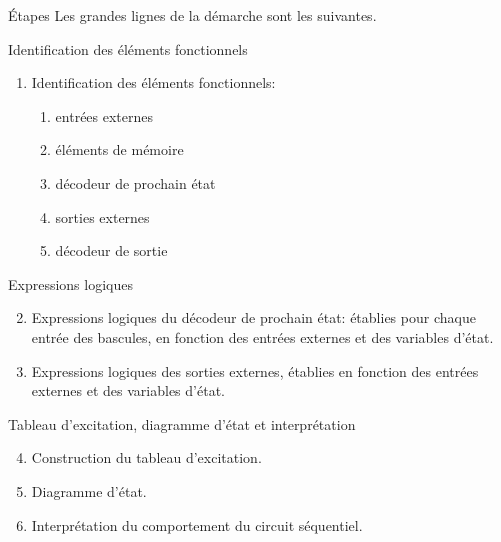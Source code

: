 \documentclass[presentation]{beamer}
\begin{document}
\begin{frame}[label={sec:orgfb9cb1f}]{Étapes}
Les grandes lignes de la démarche sont les suivantes.
\end{frame}

\begin{frame}[label={sec:org2cc9be0}]{Identification des éléments fonctionnels}
\begin{enumerate}
\item Identification des éléments fonctionnels:

\begin{enumerate}
\item entrées externes

\item éléments de mémoire

\item décodeur de prochain état

\item sorties externes

\item décodeur de sortie
\end{enumerate}
\end{enumerate}
\end{frame}

\begin{frame}[label={sec:org4eff5ab}]{Expressions logiques}
\begin{enumerate}
\setcounter{enumi}{1}
\item Expressions logiques du décodeur de prochain état: établies pour
chaque entrée des bascules, en fonction des entrées externes et des
variables d'état.

\item Expressions logiques des sorties externes, établies en fonction des
entrées externes et des variables d'état.
\end{enumerate}
\end{frame}

\begin{frame}[label={sec:org0b5f7b8}]{Tableau d'excitation, diagramme d'état et interprétation}
\begin{enumerate}
\setcounter{enumi}{3}
\item Construction du tableau d'excitation.

\setcounter{enumi}{4}
\item Diagramme d'état.

\item Interprétation du comportement du circuit séquentiel.
\end{enumerate}
\end{frame}
\end{document}
